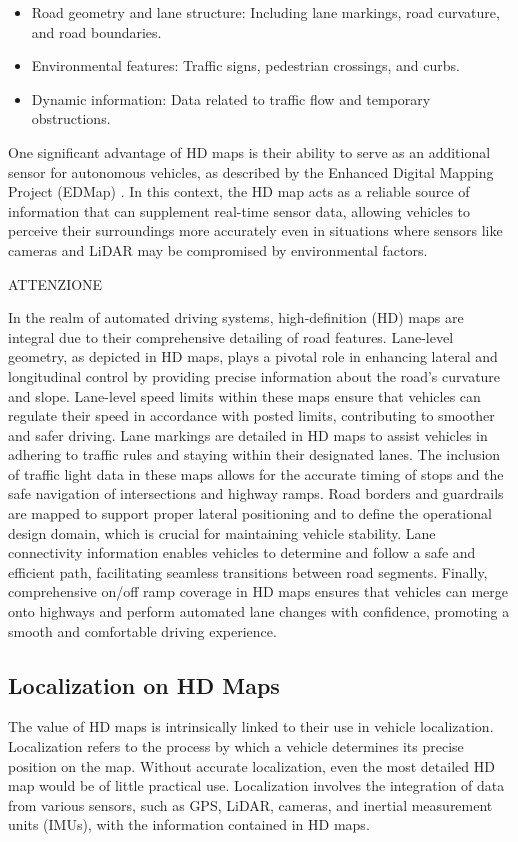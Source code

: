 \begin{itemize}
    \item Road geometry and lane structure: Including lane markings, road curvature, and road boundaries.
    \item Environmental features: Traffic signs, pedestrian crossings, and curbs.
    \item Dynamic information: Data related to traffic flow and temporary obstructions.
\end{itemize}

One significant advantage of HD maps is their ability to serve as an additional sensor for autonomous vehicles, as described by the Enhanced Digital Mapping Project (EDMap) \cite{edmap_2004} . In this context, the HD map acts as a reliable source of information that can supplement real-time sensor data, allowing vehicles to perceive their surroundings more accurately even in situations where sensors like cameras and LiDAR may be compromised by environmental factors.


ATTENZIONE %


In the realm of automated driving systems, high-definition (HD) maps are integral due to their comprehensive detailing of road features. Lane-level geometry, as depicted in HD maps, plays a pivotal role in enhancing lateral and longitudinal control by providing precise information about the road's curvature and slope. Lane-level speed limits within these maps ensure that vehicles can regulate their speed in accordance with posted limits, contributing to smoother and safer driving. Lane markings are detailed in HD maps to assist vehicles in adhering to traffic rules and staying within their designated lanes. The inclusion of traffic light data in these maps allows for the accurate timing of stops and the safe navigation of intersections and highway ramps. Road borders and guardrails are mapped to support proper lateral positioning and to define the operational design domain, which is crucial for maintaining vehicle stability. Lane connectivity information enables vehicles to determine and follow a safe and efficient path, facilitating seamless transitions between road segments. Finally, comprehensive on/off ramp coverage in HD maps ensures that vehicles can merge onto highways and perform automated lane changes with confidence, promoting a smooth and comfortable driving experience.


\subsection{Localization on HD Maps}
The value of HD maps is intrinsically linked to their use in vehicle localization. Localization refers to the process by which a vehicle determines its precise position on the map. Without accurate localization, even the most detailed HD map would be of little practical use. Localization involves the integration of data from various sensors, such as GPS, LiDAR, cameras, and inertial measurement units (IMUs), with the information contained in HD maps.

